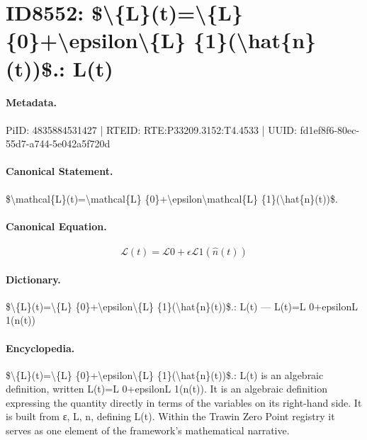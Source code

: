 \section*{ID8552: \$\textbackslash{}\{L\}(t)=\textbackslash{}\{L\} \{0\}+\textbackslash{}epsilon\textbackslash{}\{L\} \{1\}(\textbackslash{}hat\{n\}(t))\$.: L(t)}
\paragraph{Metadata.}
PiID: 4835884531427 | RTEID: RTE:P33209.3152:T4.4533 | UUID: fd1ef8f6-80ec-55d7-a744-5e042a5f720d

\paragraph{Canonical Statement.}
\$\textbackslash{}mathcal\{L\}(t)=\textbackslash{}mathcal\{L\} \{0\}+\textbackslash{}epsilon\textbackslash{}mathcal\{L\} \{1\}(\textbackslash{}hat\{n\}(t))\$.

\paragraph{Canonical Equation.}
\[
\mathcal{L}(t)=\mathcal{L} {0}+\epsilon\mathcal{L} {1}(\hat{n}(t))
\]

\paragraph{Dictionary.}
\$\textbackslash{}\{L\}(t)=\textbackslash{}\{L\} \{0\}+\textbackslash{}epsilon\textbackslash{}\{L\} \{1\}(\textbackslash{}hat\{n\}(t))\$.: L(t) — L(t)=L 0+epsilonL 1(n(t))

\paragraph{Encyclopedia.}
\$\textbackslash{}\{L\}(t)=\textbackslash{}\{L\} \{0\}+\textbackslash{}epsilon\textbackslash{}\{L\} \{1\}(\textbackslash{}hat\{n\}(t))\$.: L(t) is an algebraic definition, written L(t)=L 0+epsilonL 1(n(t)). It is an algebraic definition expressing the quantity directly in terms of the variables on its right-hand side. It is built from ε, L, n, defining L(t). Within the Trawin Zero Point registry it serves as one element of the framework's mathematical narrative.

